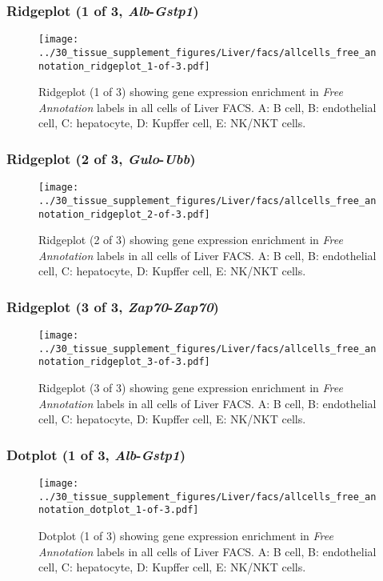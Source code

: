 \clearpage

\subsubsection{Ridgeplot (1 of 3, \emph{Alb}-\emph{Gstp1})}
\begin{figure}[h]
\centering
\texttt{[image: ../30\_tissue\_supplement\_figures/Liver/facs/allcells\_free\_annotation\_ridgeplot\_1-of-3.pdf]}

\caption{ Ridgeplot (1 of 3)  showing gene expression enrichment in \emph{Free Annotation} labels in all cells of Liver FACS. A: B cell, B: endothelial cell, C: hepatocyte, D: Kupffer cell, E: NK/NKT cells.}
\end{figure}


\clearpage

\subsubsection{Ridgeplot (2 of 3, \emph{Gulo}-\emph{Ubb})}
\begin{figure}[h]
\centering
\texttt{[image: ../30\_tissue\_supplement\_figures/Liver/facs/allcells\_free\_annotation\_ridgeplot\_2-of-3.pdf]}

\caption{ Ridgeplot (2 of 3)  showing gene expression enrichment in \emph{Free Annotation} labels in all cells of Liver FACS. A: B cell, B: endothelial cell, C: hepatocyte, D: Kupffer cell, E: NK/NKT cells.}
\end{figure}


\clearpage

\subsubsection{Ridgeplot (3 of 3, \emph{Zap70}-\emph{Zap70})}
\begin{figure}[h]
\centering
\texttt{[image: ../30\_tissue\_supplement\_figures/Liver/facs/allcells\_free\_annotation\_ridgeplot\_3-of-3.pdf]}

\caption{ Ridgeplot (3 of 3)  showing gene expression enrichment in \emph{Free Annotation} labels in all cells of Liver FACS. A: B cell, B: endothelial cell, C: hepatocyte, D: Kupffer cell, E: NK/NKT cells.}
\end{figure}


\clearpage

\subsubsection{Dotplot (1 of 3, \emph{Alb}-\emph{Gstp1})}
\begin{figure}[h]
\centering
\texttt{[image: ../30\_tissue\_supplement\_figures/Liver/facs/allcells\_free\_annotation\_dotplot\_1-of-3.pdf]}

\caption{ Dotplot (1 of 3)  showing gene expression enrichment in \emph{Free Annotation} labels in all cells of Liver FACS. A: B cell, B: endothelial cell, C: hepatocyte, D: Kupffer cell, E: NK/NKT cells.}
\end{figure}


